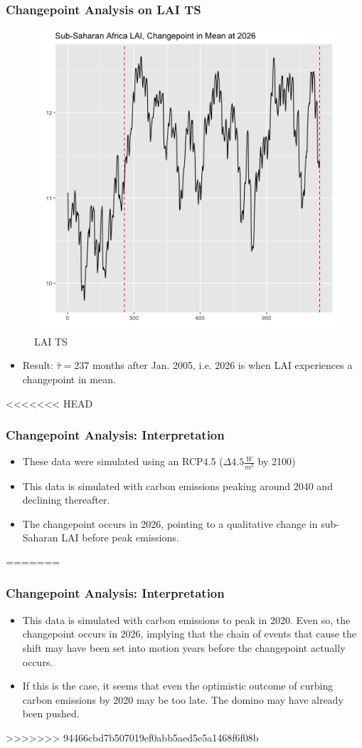 \documentclass{beamer}
\begin{document}
\begin{frame}
\frametitle{Changepoint Analysis on LAI TS}
\begin{figure}
\centering
\includegraphics[width=0.55\linewidth]{../img/changepoint_LAI.png}
\caption{LAI TS}
\end{figure}
\begin{itemize}
\item Result: $\hat{\tau}= 237$ months after Jan. 2005, i.e. 2026 is when LAI experiences a changepoint in mean.
\end{itemize}
\end{frame}

\begin{frame}
<<<<<<< HEAD
	\frametitle{Changepoint Analysis: Interpretation}
	\begin{itemize}
            \item These data were simulated using an RCP4.5
                ($\Delta 4.5 \frac{W}{m^2}$ by 2100)
		\item This data is simulated with carbon emissions peaking
                    around 2040 and declining thereafter.
                \item The changepoint occurs in 2026, pointing to a qualitative
                    change in sub-Saharan LAI before peak emissions.
	\end{itemize}
=======
\frametitle{Changepoint Analysis: Interpretation}
\begin{itemize}
\item This data is simulated with carbon emissions to peak in 2020. Even so, the changepoint occurs in 2026, implying that the chain of events that cause the shift may have been set into motion years before the changepoint actually occurs.
\item If this is the case, it seems that even the optimistic outcome of curbing carbon emissions by 2020 may be too late. The domino may have already been pushed.
\end{itemize}
>>>>>>> 94466cbd7b507019ef0abb5aed5e5a1468f6f08b
\end{frame}
\end{document}
